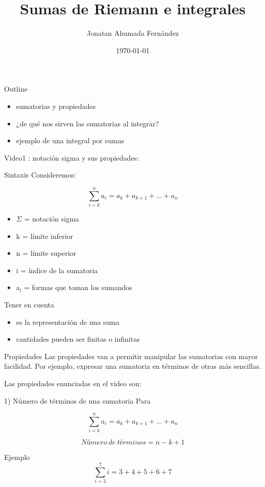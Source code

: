 \documentclass[presentation]{beamer}
\author{Jonatan Ahumada Fernández}
\date{\today}
\title{Sumas de Riemann e integrales}
\begin{document}
\maketitle
\begin{frame}{Outline}
\begin{itemize}
\item sumatorias y propiedades
\item ¿de qué nos sirven las sumatorias al integrar?
\item ejemplo de una integral por sumas 
\end{itemize}
\end{frame}


\begin{frame}[label=sec-1]{Video1 : notación sigma y sus propiedades:}
\begin{block}{Sintaxis}
Consideremos: 

\[\sum_{i=k}^{n}a_{i} = a_{k} + a_{k + 1} + \dots + a_{n}\]

\begin{itemize}
\item $\Sigma$ = notación sigma
\item k = límite inferior
\item n = límite superior
\item i = índice de la sumatoria
\item a$_{\text{i}}$ = formas que toman los sumandos
\end{itemize}
\end{block}

\begin{block}{Tener en cuenta}
\begin{itemize}
\item es la representación de una suma
\item cantidades pueden ser finitas o infinitas
\end{itemize}
\end{block}
\end{frame}

\begin{frame}[label=sec-2]{Propiedades}
Las propiedades van a permitir manipular las sumatorias con mayor facilidad.
Por ejemplo, expresar una sumatoria en términos de otras más sencillas.

Las propiedades enunciadas en el video son:
\end{frame}

\begin{frame}[label=sec-3]{1) Número de términos de una sumatoria}
Para

\[\sum_{i=k}^{n}a_{i} = a_{k} + a_{k + 1} + \dots + a_{n}\]


\[ Número\ de\ términos  = n - k + 1  \]
\begin{block}{Ejemplo}
\[\sum_{i=3}^{7}i = 3 + 4 + 5 + 6 + 7\] 
\end{block}
\end{frame}
\end{document}
